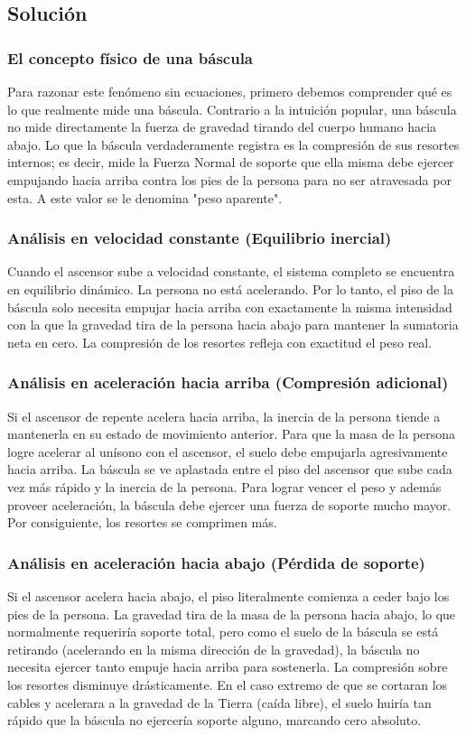 \documentclass[12pt, a4paper]{article}
\begin{document}
\subsection*{Solución}

\subsubsection*{El concepto físico de una báscula}
Para razonar este fenómeno sin ecuaciones, primero debemos comprender qué es lo que realmente mide una báscula. Contrario a la intuición popular, una báscula no mide directamente la fuerza de gravedad tirando del cuerpo humano hacia abajo. Lo que la báscula verdaderamente registra es la compresión de sus resortes internos; es decir, mide la Fuerza Normal de soporte que ella misma debe ejercer empujando hacia arriba contra los pies de la persona para no ser atravesada por esta. A este valor se le denomina "peso aparente".

\subsubsection*{Análisis en velocidad constante (Equilibrio inercial)}
Cuando el ascensor sube a velocidad constante, el sistema completo se encuentra en equilibrio dinámico. La persona no está acelerando. Por lo tanto, el piso de la báscula solo necesita empujar hacia arriba con exactamente la misma intensidad con la que la gravedad tira de la persona hacia abajo para mantener la sumatoria neta en cero. La compresión de los resortes refleja con exactitud el peso real.

\subsubsection*{Análisis en aceleración hacia arriba (Compresión adicional)}
Si el ascensor de repente acelera hacia arriba, la inercia de la persona tiende a mantenerla en su estado de movimiento anterior. Para que la masa de la persona logre acelerar al unísono con el ascensor, el suelo debe empujarla agresivamente hacia arriba. La báscula se ve aplastada entre el piso del ascensor que sube cada vez más rápido y la inercia de la persona. Para lograr vencer el peso y además proveer aceleración, la báscula debe ejercer una fuerza de soporte mucho mayor. Por consiguiente, los resortes se comprimen más.

\subsubsection*{Análisis en aceleración hacia abajo (Pérdida de soporte)}
Si el ascensor acelera hacia abajo, el piso literalmente comienza a ceder bajo los pies de la persona. La gravedad tira de la masa de la persona hacia abajo, lo que normalmente requeriría soporte total, pero como el suelo de la báscula se está retirando (acelerando en la misma dirección de la gravedad), la báscula no necesita ejercer tanto empuje hacia arriba para sostenerla. La compresión sobre los resortes disminuye drásticamente. En el caso extremo de que se cortaran los cables y acelerara a la gravedad de la Tierra (caída libre), el suelo huiría tan rápido que la báscula no ejercería soporte alguno, marcando cero absoluto.
\end{document}
